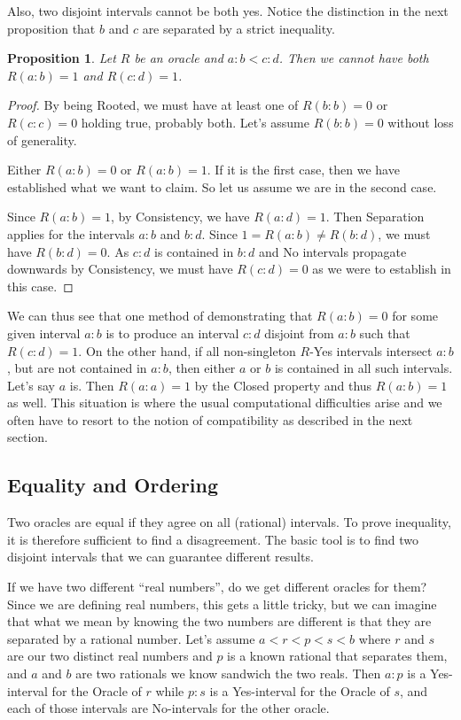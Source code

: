\documentclass[12pt]{article}
\newtheorem{proposition}{Proposition}
\theoremstyle{remark}
\begin{document}
Also, two disjoint intervals cannot be both yes. Notice the distinction in the next proposition that $b$ and $c$ are separated by a strict inequality. 

\begin{proposition} \label{pr:disjoint}
Let $R$ be an oracle and $a:b < c:d$. Then we cannot have both $R(a:b) = 1$ and $R(c:d) = 1$. 
\end{proposition}

\begin{proof}
By being Rooted, we must have at least one of $R(b:b) = 0$ or $R(c:c) = 0$ holding true, probably both. Let's assume $R(b:b) = 0$ without loss of generality.
 
Either $R(a:b) = 0$ or $R(a:b)=1$. If it is the first case, then we have established what we want to claim. So let us assume we are in the second case. 
 
Since $R(a:b) = 1$,  by Consistency, we have $R(a:d) = 1$. Then Separation applies for the intervals $a:b$ and $b:d$. Since $1 = R(a:b) \neq R(b:d)$, we must have $R(b:d) = 0$. As $c:d$ is contained in $b:d$ and No intervals propagate downwards by Consistency, we must have $R(c:d)=0$  as we were to establish in this case. 
\end{proof}

We can thus see that one method of demonstrating that $R(a:b)=0$ for some given interval $a:b$ is to produce an interval $c:d$ disjoint from $a:b$ such that $R(c:d)=1$. On the other hand, if all non-singleton $R$-Yes intervals intersect $a:b$, but are not contained in $a:b$, then either $a$ or $b$ is contained in all such intervals. Let's say $a$ is. Then $R(a:a)=1$ by the Closed property and thus $R(a:b)=1$ as well. This situation is where the usual computational difficulties arise and we often have to resort to the notion of compatibility as described in the next section. 

\subsection{Equality and Ordering}

Two oracles are equal if they agree on all (rational) intervals. To prove inequality, it is therefore sufficient to find a disagreement. The basic tool is to find two disjoint intervals that we can guarantee different results. 

If we have two different ``real numbers'', do we get different oracles for them? Since we are defining real numbers, this gets a little tricky, but we can imagine that what we mean by knowing the two numbers are different is that they are separated by a rational number. Let's assume $a < r < p < s < b$ where $r$ and $s$ are our two distinct real numbers and $p$ is a known rational that separates them, and $a$ and $b$ are two rationals we know sandwich the two reals. Then $a:p$ is a Yes-interval for the Oracle of $r$ while $p:s$ is a Yes-interval for the Oracle of $s$, and each of those intervals are No-intervals for the other oracle. 
\end{document}
